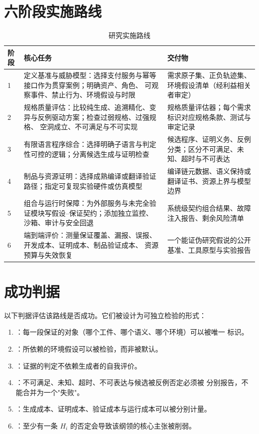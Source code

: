 \section{六阶段实施路线}

\begin{table}[htbp]
\centering
\small
\caption{研究实施路线}\label{tab:roadmap}
\begin{tabular}{L{1.0cm}L{6.3cm}L{7.0cm}}
\toprule
\textbf{阶段} & \textbf{核心任务} & \textbf{交付物} \\
 & 定义基准与威胁模型：选择支付服务与幂等接口作为贯穿案例；明确资产、角色、
  可观察事件、禁止行为、环境假设与时限 &
  需求原子集、正负轨迹集、环境假设清单（经利益相关者审定） \\
2 & 规格质量评估：比较纯生成、追溯精化、变异与反例驱动方案；检查过弱规格、过强规格、
  空洞成立、不可满足与不可实现 &
  规格质量评估器；每个需求标识对应规格条款、测试与审定记录 \\
3 & 有限语言程序综合：选择明确子语言与判定性可控的逻辑；分离候选生成与证明检查 &
  候选程序、证明义务、反例分类；区分不可满足、未知、超时与不可表达 \\
4 & 制品与资源证明：选择成熟编译或翻译验证路径；指定可复现实验硬件或仿真模型 &
  编译链元数据、语义保持或翻译证书、资源上界与模型边界 \\
5 & 组合与运行时保障：为外部服务与未完全验证模块写假设--保证契约；添加独立监控、
  沙箱、审计与安全回退 &
  系统级契约组合结果、故障注入报告、剩余风险清单 \\
6 & 端到端评价：测量保证覆盖、漏报、误报、开发成本、证明成本、制品验证成本、
  资源预算与失效恢复 &
  一个能证伪研究假说的公开基准、工具原型与实验报告 \\
\bottomrule
\end{tabular}
\end{table}

\section{成功判据}

以下判据评估该路线是否成功。它们被设计为可独立检验的形式：

\begin{enumerate}[label=(S\arabic*)]
\item {}：每一段保证的对象（哪个工件、哪个语义、哪个环境）可以被唯一
      标识。
\item {}：所依赖的环境假设可以被检验，而非被默认。
\item {}：证据的判定不依赖生成者的自我评价。
\item {}：不可满足、未知、超时、不可表达与候选被反例否定必须被
      分别报告，不能合并为一个"失败"。
\item {}：生成成本、证明成本、验证成本与运行成本可以被分别计量。
\item {}：至少有一条 $H_i$ 的否定会导致该纲领的核心主张被削弱。
\end{enumerate}


